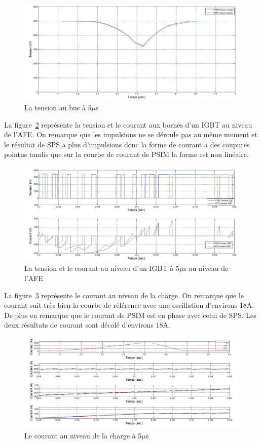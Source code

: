 \documentclass[11pt,letterpaper,final]{report}
\begin{document}
\begin{figure}[htb]
\centering
\includegraphics[scale=0.5]{Fig/Hach_AFE/5u/ten_bus.jpg}
\caption{La tension au bus à 5$\mu$s}
\label{AF_HA_vch5}
\end{figure}

La figure~\ref{AF_HA_IGBT5} représente la tension et le courant aux bornes d'un IGBT au niveau de l'AFE. On remarque que les impulsions ne se déroule pas au même moment et le résultat de SPS a plus d'impulsions donc la forme de courant a des coupures pointus tandis que sur la courbe de courant de PSIM la forme est non linéaire.

\begin{figure}[htb]
\centering
\includegraphics[scale=0.5]{Fig/Hach_AFE/5u/IGBT_AFE.jpg}
\caption{La tension et le courant au niveau d'un IGBT à 5$\mu$s au niveau de l'AFE}
\label{AF_HA_IGBT5}
\end{figure}

La figure~\ref{AF_HA_CHA5} représente le courant au niveau de la charge. On remarque que le courant suit très bien la courbe de référence avec une oscillation d'environs 18A. De plus en remarque que le courant de PSIM est en phase avec celui de SPS. Les deux résultats de courant sont décalé d'environs 18A. 

\begin{figure}[htb]
\centering
\includegraphics[scale=0.5]{Fig/Hach_AFE/5u/hach_cou_ch.jpg}
\caption{Le courant au niveau de la charge à 5$\mu$s}
\label{AF_HA_CHA5}
\end{figure}
\end{document}
